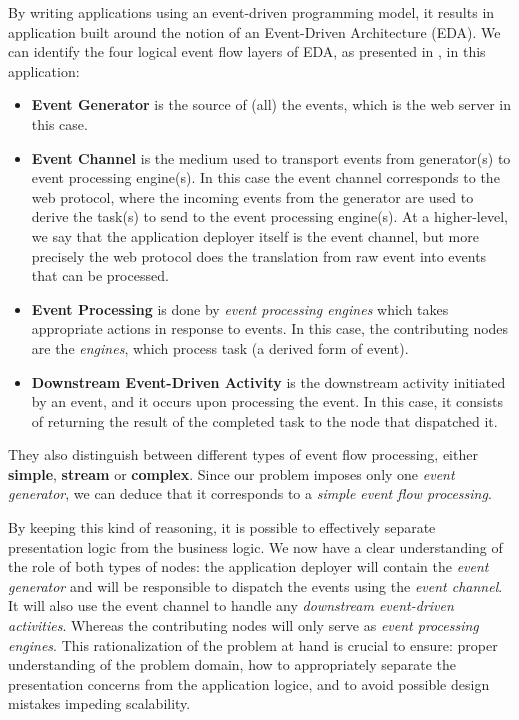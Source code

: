 \documentclass[12pt, titlepage]{uo_temp}
\begin{document}
     By writing applications using an event-driven programming model, it results in
     application built around the notion of an Event-Driven Architecture (EDA). We can identify the four
     logical event flow layers of EDA, as presented in \cite{michelson2006event}, in this
     application:
     \begin{itemize}
     \item \textbf{Event Generator} is the source of (all) the events, which is the web server
       in this case.
     \item \textbf{Event Channel} is the medium used to transport events from generator(s)
       to event processing engine(s). In this case the event channel corresponds to the
       web protocol, where the incoming events from the generator are used to derive the
       task(s) to send to the event processing engine(s). At a higher-level, we say that
       the application deployer itself is the event channel, but more precisely the web
       protocol does the translation from raw event into events that can be processed.
     \item \textbf{Event Processing} is done by \emph{event processing engines} which
       takes appropriate actions in response to events. In this case, the
       contributing nodes are the \emph{engines}, which process task (a derived form of event).
     \item \textbf{Downstream Event-Driven Activity} is the downstream activity initiated
       by an event, and it occurs upon processing the event. In this case, it consists of
       returning the result of the completed task to the node that dispatched it.
     \end{itemize}
     
     They also distinguish between different types of event flow processing, either
     \textbf{simple}, \textbf{stream} or \textbf{complex}. Since our problem imposes only
     one \emph{event generator}, we can deduce that it corresponds to a \emph{simple event
       flow processing}.

     By keeping this kind of reasoning, it is possible to effectively separate
     presentation logic from the business logic. We now have a clear understanding of the
     role of both types of nodes: the application deployer will contain the \emph{event
       generator} and will be responsible to dispatch the events using the \emph{event
       channel}. It will also use the event channel to handle any \emph{downstream
       event-driven activities}. Whereas the contributing nodes will only serve as
     \emph{event processing engines}. This rationalization of the problem at hand is
     crucial to ensure: proper understanding of the problem domain, how to appropriately
     separate the presentation concerns from the application logice, and to avoid possible
     design mistakes impeding scalability.
\end{document}
